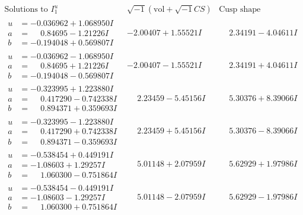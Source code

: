 \documentclass[1p]{elsarticle_modified}
\theoremstyle{definition}
\newcommand{\I}{\sqrt{-1}}
\begin{document}
$$\begin{array}{c|c|c}  
\text{Solutions to }I^u_{1}& \I (\text{vol} + \sqrt{-1}CS) & \text{Cusp shape}\\
 \hline 
\begin{aligned}
u &= -0.036962 + 1.068950 I \\
a &= \phantom{-}0.84695 - 1.21226 I \\
b &= -0.194048 + 0.569807 I\end{aligned}
 & -2.00407 + 1.55521 I & \phantom{-}2.34191 - 4.04611 I \\ \hline\begin{aligned}
u &= -0.036962 - 1.068950 I \\
a &= \phantom{-}0.84695 + 1.21226 I \\
b &= -0.194048 - 0.569807 I\end{aligned}
 & -2.00407 - 1.55521 I & \phantom{-}2.34191 + 4.04611 I \\ \hline\begin{aligned}
u &= -0.323995 + 1.223880 I \\
a &= \phantom{-}0.417290 - 0.742338 I \\
b &= \phantom{-}0.894371 + 0.359693 I\end{aligned}
 & \phantom{-}2.23459 - 5.45156 I & \phantom{-}5.30376 + 8.39066 I \\ \hline\begin{aligned}
u &= -0.323995 - 1.223880 I \\
a &= \phantom{-}0.417290 + 0.742338 I \\
b &= \phantom{-}0.894371 - 0.359693 I\end{aligned}
 & \phantom{-}2.23459 + 5.45156 I & \phantom{-}5.30376 - 8.39066 I \\ \hline\begin{aligned}
u &= -0.538454 + 0.449191 I \\
a &= -1.08603 + 1.29257 I \\
b &= \phantom{-}1.060300 - 0.751864 I\end{aligned}
 & \phantom{-}5.01148 + 2.07959 I & \phantom{-}5.62929 + 1.97986 I \\ \hline\begin{aligned}
u &= -0.538454 - 0.449191 I \\
a &= -1.08603 - 1.29257 I \\
b &= \phantom{-}1.060300 + 0.751864 I\end{aligned}
 & \phantom{-}5.01148 - 2.07959 I & \phantom{-}5.62929 - 1.97986 I \\ \hline\begin{aligned}

\end{aligned}
\end{array}$$
\end{document}
